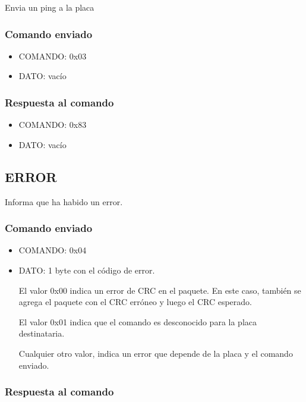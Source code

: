 \documentclass[a4paper,10pt]{article}
\begin{document}
Envia un ping a la placa

\subsubsection*{Comando enviado}
\label{ping_comando_enviado}

\begin{itemize}
	\item{COMANDO:} 0x03
	\item{DATO:} vac\'io
\end{itemize}

\subsubsection*{Respuesta al comando}
\label{ping_respuesta}

\begin{itemize}
	\item{COMANDO:} 0x83
	\item{DATO:} vac\'io
\end{itemize}

\subsection{ERROR}
\label{error}

Informa que ha habido un error.

\subsubsection*{Comando enviado}
\label{error_comando_enviado}

\begin{itemize}
	\item{COMANDO:} 0x04
	\item{DATO:} 1 byte con el c\'odigo de error.

	El valor 0x00 indica un error de CRC en el paquete. 
	En este caso, tambi\'en se agrega el paquete con el CRC err\'oneo y luego el CRC esperado.

	El valor 0x01 indica que el comando es desconocido para la placa destinataria.

	Cualquier otro valor, indica un error que depende de la placa y el comando enviado.
\end{itemize}

\subsubsection*{Respuesta al comando}
\label{error_respuesta}
\end{document}

